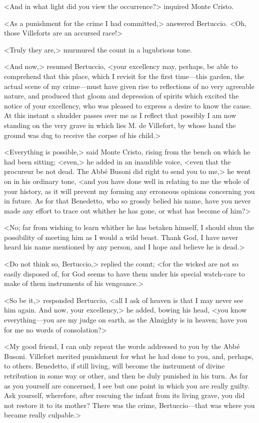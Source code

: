  <And in what light did you view the occurrence?> inquired Monte Cristo. 

 <As a punishment for the crime I had committed,> answered Bertuccio. <Oh, those Villeforts are an accursed race!> 

 <Truly they are,> murmured the count in a lugubrious tone. 

 <And now,> resumed Bertuccio, <your excellency may, perhaps, be able to comprehend that this place, which I revisit for the first time—this garden, the actual scene of my crime—must have given rise to reflections of no very agreeable nature, and produced that gloom and depression of spirits which excited the notice of your excellency, who was pleased to express a desire to know the cause. At this instant a shudder passes over me as I reflect that possibly I am now standing on the very grave in which lies M. de Villefort, by whose hand the ground was dug to receive the corpse of his child.> 

 <Everything is possible,> said Monte Cristo, rising from the bench on which he had been sitting; <even,> he added in an inaudible voice, <even that the procureur be not dead. The Abbé Busoni did right to send you to me,> he went on in his ordinary tone, <and you have done well in relating to me the whole of your history, as it will prevent my forming any erroneous opinions concerning you in future. As for that Benedetto, who so grossly belied his name, have you never made any effort to trace out whither he has gone, or what has become of him?> 

 <No; far from wishing to learn whither he has betaken himself, I should shun the possibility of meeting him as I would a wild beast. Thank God, I have never heard his name mentioned by any person, and I hope and believe he is dead.> 

 <Do not think so, Bertuccio,> replied the count; <for the wicked are not so easily disposed of, for God seems to have them under his special watch-care to make of them instruments of his vengeance.> 

 <So be it,> responded Bertuccio, <all I ask of heaven is that I may never see him again. And now, your excellency,> he added, bowing his head, <you know everything—you are my judge on earth, as the Almighty is in heaven; have you for me no words of consolation?> 

 <My good friend, I can only repeat the words addressed to you by the Abbé Busoni. Villefort merited punishment for what he had done to you, and, perhaps, to others. Benedetto, if still living, will become the instrument of divine retribution in some way or other, and then be duly punished in his turn. As far as you yourself are concerned, I see but one point in which you are really guilty. Ask yourself, wherefore, after rescuing the infant from its living grave, you did not restore it to its mother? There was the crime, Bertuccio—that was where you became really culpable.> 

